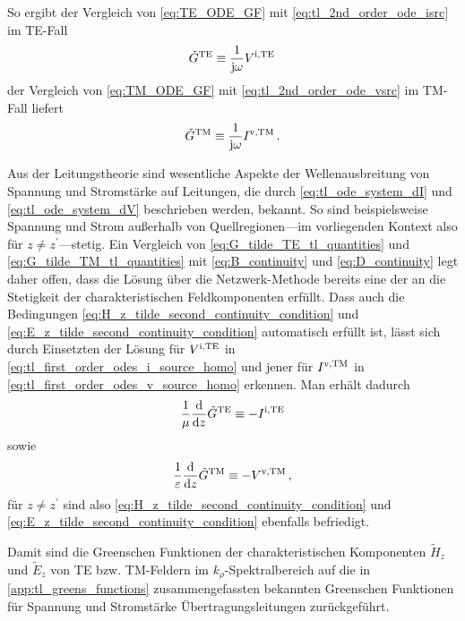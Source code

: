 So ergibt der Vergleich von \eqref{eq:TE_ODE_GF} mit
\eqref{eq:tl_2nd_order_ode_isrc} im TE-Fall
\begin{equation}\label{eq:G_tilde_TE_tl_quantities}
	\tilde{G}^{\mathrm{TE}} \equiv \frac{1}{\mathrm{j} \omega} V^{\mathrm{i},\mathrm{TE}} \,
\end{equation}
der Vergleich von \eqref{eq:TM_ODE_GF} mit \eqref{eq:tl_2nd_order_ode_vsrc}
im TM-Fall liefert
\begin{equation}\label{eq:G_tilde_TM_tl_quantities}
	\tilde{G}^{\mathrm{TM}} \equiv \frac{1}{\mathrm{j} \omega} I^{\mathrm{v},\mathrm{TM}} \, .
\end{equation}

Aus der Leitungstheorie \cite{Pozar2011} sind wesentliche Aspekte der
Wellenausbreitung von Spannung und Stromstärke auf Leitungen, die durch
\eqref{eq:tl_ode_system_dI} und \eqref{eq:tl_ode_system_dV} beschrieben werden,
bekannt.
So sind beispielsweise Spannung und Strom außerhalb von Quellregionen---im
vorliegenden Kontext also für $z \neq z^\prime$---stetig.
Ein Vergleich von \eqref{eq:G_tilde_TE_tl_quantities} und
\eqref{eq:G_tilde_TM_tl_quantities} mit \eqref{eq:B_continuity} und
\eqref{eq:D_continuity} legt daher offen, dass die Lösung über die
Netzwerk-Methode bereits eine der an die Stetigkeit der charakteristischen
Feldkomponenten erfüllt.
Dass auch die Bedingungen \eqref{eq:H_z_tilde_second_continuity_condition} und
\eqref{eq:E_z_tilde_second_continuity_condition} automatisch erfüllt ist, lässt
sich durch Einsetzten der Lösung für $V^{\mathrm{i},\mathrm{TE}}$ in
\eqref{eq:tl_first_order_odes_i_source_homo} und jener für $I^{\mathrm{v},\mathrm{TM}}$ in
\eqref{eq:tl_first_order_odes_v_source_homo} erkennen.
Man erhält dadurch
\begin{equation}
	\frac{1}{\mu} \frac{\mathrm{d}}{\mathrm{d} z} \tilde{G}^{\mathrm{TE}} \equiv - I^{\mathrm{i},\mathrm{TE}}
\end{equation}
sowie
\begin{equation}
	\frac{1}{\varepsilon} \frac{\mathrm{d}}{\mathrm{d} z} \tilde{G}^{\mathrm{TM}} \equiv - V^{\mathrm{v},\mathrm{TM}} \,,
\end{equation}
für $z \neq z^\prime$ sind also \eqref{eq:H_z_tilde_second_continuity_condition}
und \eqref{eq:E_z_tilde_second_continuity_condition} ebenfalls befriedigt.

Damit sind die Greenschen Funktionen der charakteristischen Komponenten
$\tilde{H}_z$ und $\tilde{E}_z$ von TE bzw.
TM-Feldern im $k_\rho$-Spektralbereich auf die in \cref{app:tl_greens_functions}
zusammengefassten bekannten Greenschen Funktionen für Spannung und Stromstärke
Übertragungsleitungen zurückgeführt.

